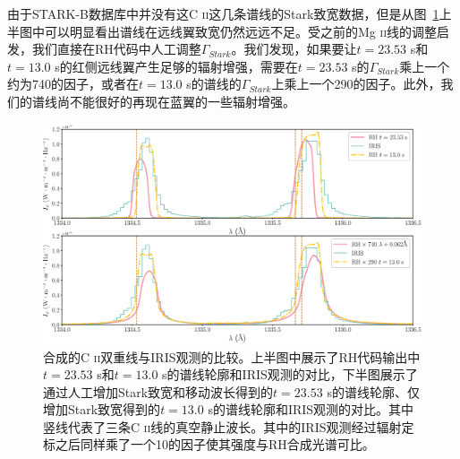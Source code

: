 由于STARK-B数据库中并没有这C \textsc{ii}这几条谱线的Stark致宽数据，但是从图~\ref{fig:3.7}上半图中可以明显看出谱线在远线翼致宽仍然远远不足。受之前的Mg \textsc{ii}线的调整启发，我们直接在RH代码中人工调整$\Gamma_{Stark}$。我们发现，如果要让$t=23.53$ s和$t=13.0$ s的红侧远线翼产生足够的辐射增强，需要在$t=23.53$ s的$\Gamma_{Stark}$乘上一个约为740的因子，或者在$t=13.0$ s的谱线的$\Gamma_{Stark}$上乘上一个290的因子。此外，我们的谱线尚不能很好的再现在蓝翼的一些辐射增强。

\begin{figure}
	\centering
	\includegraphics[width=\textwidth]{figs/5F11_IRIS_CII}
	\caption{合成的C \textsc{ii}双重线与IRIS观测的比较。上半图中展示了RH代码输出中$t=23.53$ s和$t=13.0$ s的谱线轮廓和IRIS观测的对比，下半图展示了通过人工增加Stark致宽和移动波长得到的$t=23.53$ s的谱线轮廓、仅增加Stark致宽得到的$t=13.0$ s的谱线轮廓和IRIS观测的对比。其中竖线代表了三条C \textsc{ii}线的真空静止波长。其中的IRIS观测经过辐射定标之后同样乘了一个10的因子使其强度与RH合成光谱可比。}
	\label{fig:3.7}
\end{figure}


